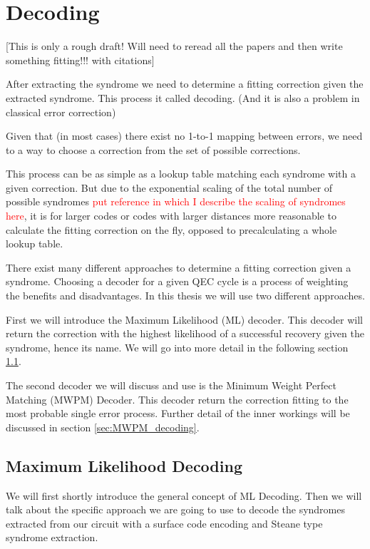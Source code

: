 \chapter{Decoding}
[This is only a rough draft! Will need to reread all the papers and then write something fitting!!! with citations]

After extracting the syndrome we need to determine a fitting correction given the extracted syndrome.
This process it called decoding.
(And it is also a problem in classical error correction) 

Given that (in most cases) there exist no 1-to-1 mapping between errors, we need to a way to choose a correction from the set of possible corrections. 

This process can be as simple as a lookup table matching each syndrome with a given correction.
But due to the exponential scaling of the total number of possible syndromes \textcolor{red}{put reference in which I describe the scaling of syndromes here},
it is for larger codes or codes with larger distances more reasonable to calculate the fitting correction on the fly, opposed to precalculating a whole lookup table.

There exist many different approaches to determine a fitting correction given a syndrome.
Choosing a decoder for a given QEC cycle is a process of weighting the benefits and disadvantages. 
In this thesis we will use two different approaches.

First we will introduce the Maximum Likelihood (ML) decoder. 
This decoder will return the correction with the highest likelihood of a successful recovery given the syndrome, hence its name. 
We will go into more detail in the following section \ref{sec:ML_decoding}.

The second decoder we will discuss and use is the Minimum Weight Perfect Matching (MWPM) Decoder.
This decoder return the correction fitting to the most probable single error process.
Further detail of the inner workings will be discussed in section \ref{sec:MWPM_decoding}.



\section{Maximum Likelihood Decoding}\label{sec:ML_decoding}

We will first shortly introduce the general concept of ML Decoding.
Then we will talk about the specific approach we are going to use to decode the syndromes extracted from our circuit with a surface code encoding and Steane type syndrome extraction.

